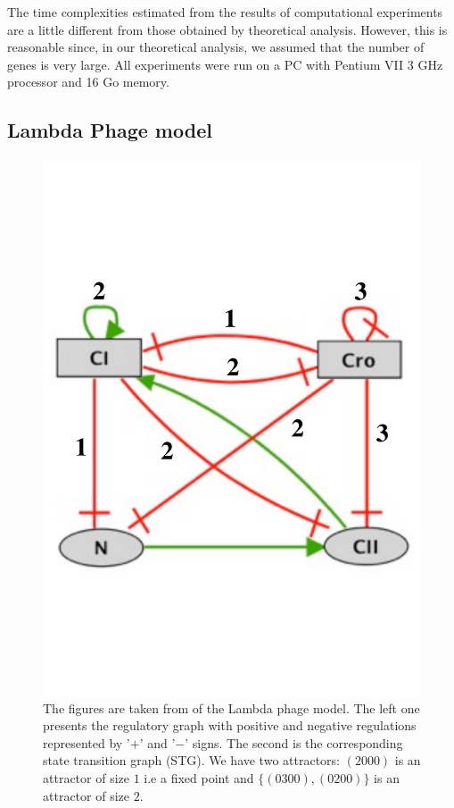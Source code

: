 
The time complexities estimated from the results of computational experiments are a little different from those obtained by theoretical analysis. However, this is reasonable since, in our theoretical analysis, we assumed that the number of genes is very large.
All experiments were run on a PC with Pentium VII 3 GHz processor and 16 Go memory.

\subsection{Lambda Phage model}
\begin{figure}[h]
   \caption{\label{fig:lambda-graph} 
   The figures are taken from \cite{thieffry1995dynamical,chaouiya2008petri} of the Lambda phage model. The left one presents the regulatory graph with positive and negative regulations represented by ’$+$’ and ’$-$’ signs. The second is the corresponding state transition graph (STG).%
We have two attractors: $(2000)$ is an attractor of size $1$ i.e a fixed point and $\{(0300), (0200)\}$ is an attractor of size $2$.}
   \includegraphics{figures/lampdaphage-thomas.pdf}

\end{figure}
